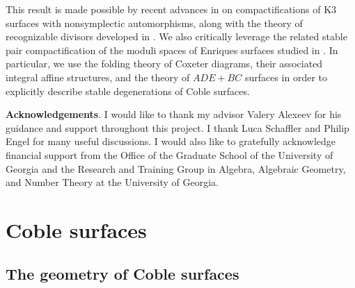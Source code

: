 \documentclass{amsart}
\begin{document}
\begin{remark}

This result is made possible by recent advances in \cite{AE22,alexeev2021nonsymplectic} on compactifications of K3 surfaces with nonsymplectic automorphisms, along with the theory of recognizable divisors developed in \cite{alexeev2023compact}. We also critically leverage the related stable pair compactification of the moduli spaces of Enriques surfaces studied in \cite{AEGS23}. In particular, we use the folding theory of Coxeter diagrams, their associated integral affine structures, and the theory of \(ADE+BC\) surfaces in order to explicitly describe stable degenerations of Coble surfaces.

\end{remark}

\textbf{Acknowledgements}. I would like to thank my advisor Valery Alexeev for his guidance and support throughout this project. I thank Luca Schaffler and Philip Engel for many useful discussions. I would also like to gratefully acknowledge financial support from the Office of the Graduate School of the University of Georgia and the Research and Training Group in Algebra, Algebraic Geometry, and Number Theory at the University of Georgia.

\section{Coble surfaces}\label{coble-surfaces}

\subsection{The geometry of Coble surfaces}\label{the-geometry-of-coble-surfaces}
\end{document}

